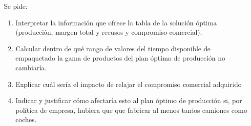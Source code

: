 Se pide:

\begin{enumerate}
    \item Interpretar la información que ofrece la tabla de la solución óptima (producción, margen total y recusos y compromiso comercial).
    
    \item Calcular dentro de qué rango de valores del tiempo disponible de empaquetado la gama de productos del plan óptima de producción no cambiaría.
    
    \item Explicar cuál sería el impacto de relajar el compromiso comercial adquirido

    \item Indicar y justificar cómo afectaría esto al plan óptimo de producción si, por política de empresa, hubiera que que fabricar al menos tantos camiones como coches.
   
\end{enumerate}







